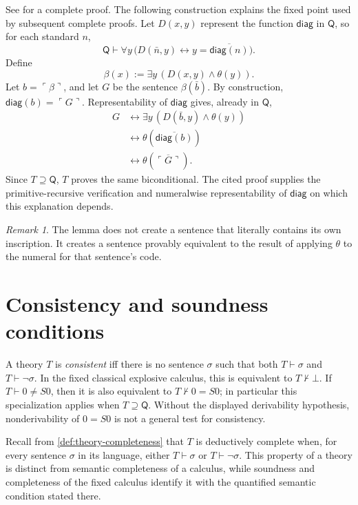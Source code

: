 \documentclass[11pt,oneside,openany]{book}
\theoremstyle{definition}
\newtheorem{definition}{Definition}[chapter]
\theoremstyle{plain}
\theoremstyle{remark}
\newtheorem{remark}[definition]{Remark}
\let\LogicDefinition\definition
\let\endLogicDefinition\enddefinition
\renewenvironment{definition}[1][]{%
  \LogicDefinition[#1]%
  \if\relax\detokenize{#1}\relax\else\index{#1}\fi
}{\endLogicDefinition}
\newcommand{\derives}{\vdash}
\newcommand{\notderives}{\not\vdash}
\newcommand{\bottom}{\bot}
\newcommand{\defeq}{\mathrel{:=}}
\begin{document}
See \cite{BoolosBurgessJeffrey2007} for a complete proof.  The following
construction explains the fixed point used by subsequent complete proofs.
Let \(D(x,y)\) represent the function \(\mathsf{diag}\) in \(\mathsf Q\), so
for each standard \(n\),
\[
  \mathsf Q\derives\forall y\,
  \bigl(D(\bar n,y)\leftrightarrow
  y=\overline{\mathsf{diag}(n)}\bigr).
\]
Define
\[
  \beta(x)\defeq\exists y\,(D(x,y)\land\theta(y)).
\]
Let \(b=\ulcorner\beta\urcorner\), and let
\(G\) be the sentence \(\beta(\bar b)\).  By construction,
\(\mathsf{diag}(b)=\ulcorner G\urcorner\).  Representability of
\(\mathsf{diag}\) gives, already in \(\mathsf Q\),
\[
\begin{aligned}
  G
  &\leftrightarrow \exists y\,(D(\bar b,y)\land\theta(y))\\
  &\leftrightarrow
  \theta(\overline{\mathsf{diag}(b)})\\
  &\leftrightarrow\theta(\overline{\ulcorner G\urcorner}).
\end{aligned}
\]
Since \(T\supseteq\mathsf Q\), \(T\) proves the same biconditional.
The cited proof supplies the primitive-recursive verification and numeralwise
representability of \(\mathsf{diag}\) on which this explanation depends.

\begin{remark}
The lemma does not create a sentence that literally contains its own
inscription.  It creates a sentence provably equivalent to the result of
applying \(\theta\) to the numeral for that sentence's code.
\end{remark}

\section{Consistency and soundness conditions}
\label{sec:first-incompleteness-02}

\begin{definition}[Consistency]
A theory \(T\) is \emph{consistent} iff there is no sentence \(\sigma\) such
that both \(T\derives\sigma\) and \(T\derives\neg\sigma\).  In the fixed
classical explosive calculus, this is equivalent to
\(T\notderives\bottom\).  If \(T\derives 0\ne S0\), then it is also
equivalent to \(T\notderives 0=S0\); in particular this specialization applies
when \(T\supseteq\mathsf Q\).  Without the displayed derivability hypothesis,
nonderivability of \(0=S0\) is not a general test for consistency.
\end{definition}

Recall from \cref{def:theory-completeness} that \(T\) is deductively complete
when, for every sentence \(\sigma\) in its language, either
\(T\derives\sigma\) or \(T\derives\neg\sigma\).  This property of a theory is
distinct from semantic completeness of a calculus, while soundness and
completeness of the fixed calculus identify it with the quantified semantic
condition stated there.
\end{document}
